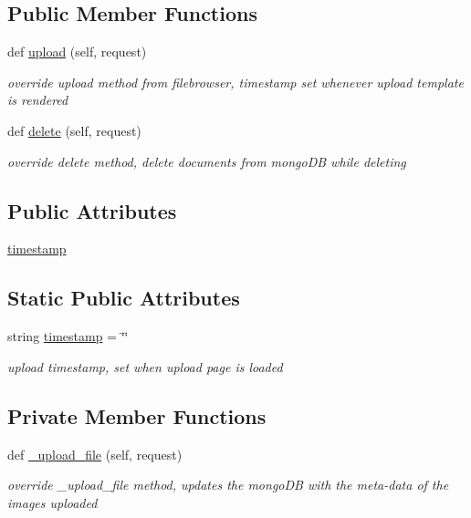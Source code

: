 \subsection*{Public Member Functions}
\begin{DoxyCompactItemize}
\item 
def \hyperlink{classimgapp_1_1filebrowser__upload_1_1UserFileBrowserSite_a07e6d41b7640acdd9a559e42c1b4229e}{upload} (self, request)
\begin{DoxyCompactList}\small\item\em override upload method from filebrowser, timestamp set whenever upload template is rendered \end{DoxyCompactList}\item 
def \hyperlink{classimgapp_1_1filebrowser__upload_1_1UserFileBrowserSite_ad706842ee49a2e7839af4d0c61b0517d}{delete} (self, request)
\begin{DoxyCompactList}\small\item\em override delete method, delete documents from mongo\+DB while deleting \end{DoxyCompactList}\end{DoxyCompactItemize}
\subsection*{Public Attributes}
\begin{DoxyCompactItemize}
\item 
\hyperlink{classimgapp_1_1filebrowser__upload_1_1UserFileBrowserSite_aa4e34ba61b9cd7c4d69ac511de270174}{timestamp}
\end{DoxyCompactItemize}
\subsection*{Static Public Attributes}
\begin{DoxyCompactItemize}
\item 
string \hyperlink{classimgapp_1_1filebrowser__upload_1_1UserFileBrowserSite_a9e3493a762e943bc6cfe568d76b7a9b2}{timestamp} = \char`\"{}\char`\"{}
\begin{DoxyCompactList}\small\item\em upload timestamp, set when upload page is loaded \end{DoxyCompactList}\end{DoxyCompactItemize}
\subsection*{Private Member Functions}
\begin{DoxyCompactItemize}
\item 
def \hyperlink{classimgapp_1_1filebrowser__upload_1_1UserFileBrowserSite_a0c0d6760aed5d2927184ed93c383deda}{\+\_\+upload\+\_\+file} (self, request)
\begin{DoxyCompactList}\small\item\em override \+\_\+upload\+\_\+file method, updates the mongo\+DB with the meta-\/data of the images uploaded \end{DoxyCompactList}\end{DoxyCompactItemize}


